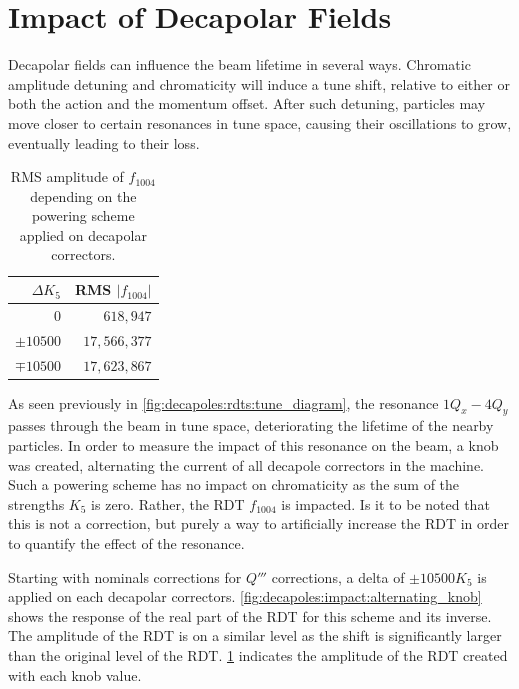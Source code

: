 \section{Impact of Decapolar Fields}

Decapolar fields can influence the beam lifetime in several ways. Chromatic amplitude detuning and
chromaticity will induce a tune shift, relative to either or both the action and the momentum
offset. After such detuning, particles may move closer to certain resonances in tune space, causing
their oscillations to grow, eventually leading to their loss.


\begin{table}
    \centering
    \begin{tabular}{r|r}
    $\Delta K_5$         & RMS $|f_{1004}|$ \\ \hline
    $0$                  &            $618,947$ \\
    $\pm10500$             &         $17,566,377$ \\
    $\mp10500$             &         $17,623,867$ \\
    \end{tabular}
    \caption{RMS amplitude of $f_{1004}$ depending on the powering scheme applied on decapolar
    correctors.}
    \label{table:decapoles:impact:rdt_amplitude}
\end{table}

As seen previously in \cref{fig:decapoles:rdts:tune_diagram}, the resonance $1Q_x - 4Q_y$ passes
through the beam in tune space, deteriorating the lifetime of the nearby particles.
In order to measure the impact of this resonance on the beam, a knob was created, alternating the 
current of all decapole correctors in the machine. Such a powering scheme has no impact on 
chromaticity as the sum of the strengths $K_5$ is zero. Rather, the RDT $f_{1004}$ is impacted.
Is it to be noted that this is not a correction, but purely a way to artificially increase the RDT
in order to quantify the effect of the resonance.

Starting with nominals corrections for $Q'''$ corrections, a delta of $\pm 10500 K_5$ is applied on
each decapolar correctors. \cref{fig:decapoles:impact:alternating_knob} shows the response of the
real part of the RDT for this scheme and its inverse. The amplitude of the RDT is on a similar level
as the shift is significantly larger than the original level of the RDT.
\cref{table:decapoles:impact:rdt_amplitude} indicates the amplitude of the RDT created with each
knob value.

